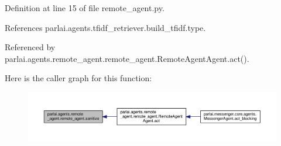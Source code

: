Definition at line 15 of file remote\+\_\+agent.\+py.



References parlai.\+agents.\+tfidf\+\_\+retriever.\+build\+\_\+tfidf.\+type.



Referenced by parlai.\+agents.\+remote\+\_\+agent.\+remote\+\_\+agent.\+Remote\+Agent\+Agent.\+act().

Here is the caller graph for this function\+:
\nopagebreak
\begin{figure}[H]
\begin{center}
\leavevmode
\includegraphics[width=350pt]{namespaceparlai_1_1agents_1_1remote__agent_1_1remote__agent_a89751a1e0abc561f94b94db63d8ee2c4_icgraph}
\end{center}
\end{figure}
